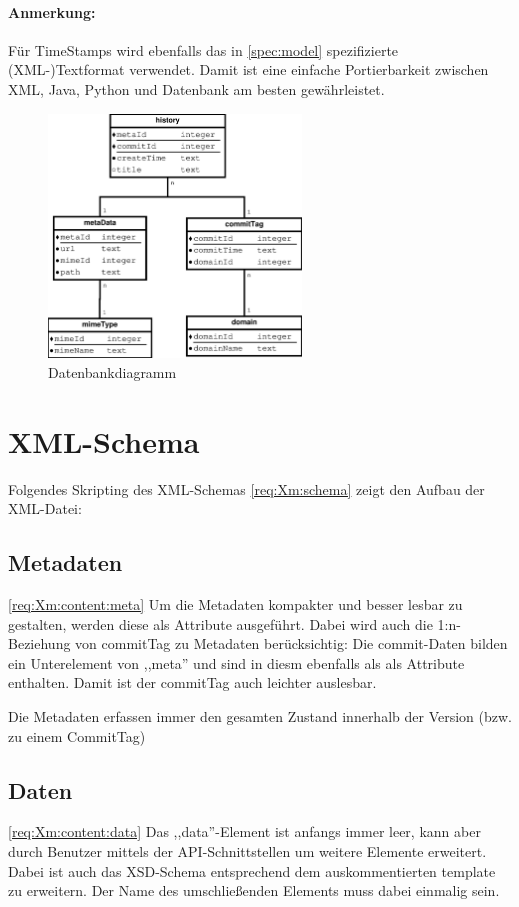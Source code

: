 \paragraph{Anmerkung:} Für TimeStamps wird ebenfalls das in \ref{spec:model} spezifizierte (XML-)Textformat
verwendet. Damit ist eine einfache Portierbarkeit zwischen XML, Java, Python und Datenbank am besten gewährleistet.

\begin{figure}[h]
	\centering
	\label{dia:design:frontend:data:db}
	\includegraphics[width=0.6\textwidth]{design/data/db.eps}
	\caption{Datenbankdiagramm}
\end{figure}

\section{XML-Schema}
Folgendes Skripting des XML-Schemas \ref{req:Xm:schema} zeigt den Aufbau der XML-Datei:

\subsection{Metadaten}
\ref{req:Xm:content:meta}
Um die Metadaten kompakter und besser lesbar zu gestalten, 
werden diese als Attribute ausgeführt. 
Dabei wird auch die 1:n-Beziehung von commitTag zu Metadaten berücksichtig:
Die commit-Daten bilden ein Unterelement von ,,meta'' und sind in diesm ebenfalls als
als Attribute enthalten.
Damit ist der commitTag auch leichter auslesbar.


Die Metadaten erfassen immer den gesamten Zustand innerhalb der Version (bzw. zu einem CommitTag)
\subsection{Daten}
\ref{req:Xm:content:data}
Das ,,data''-Element ist anfangs immer leer, kann aber durch Benutzer mittels der API-Schnittstellen 
um weitere Elemente erweitert.
Dabei ist auch das XSD-Schema entsprechend dem auskommentierten template zu erweitern.
Der Name des umschließenden Elements muss dabei einmalig sein.

